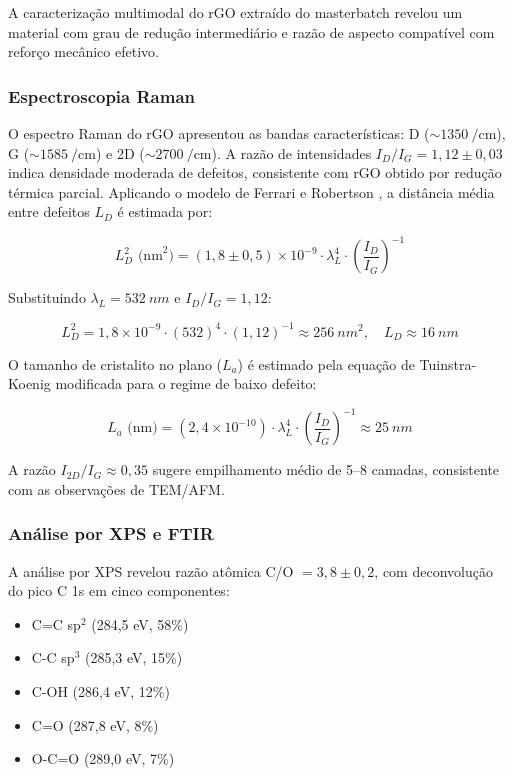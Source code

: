 \documentclass[12pt,a4paper,twoside]{article}
\begin{document}
A caracterização multimodal do rGO extraído do masterbatch revelou um material com grau de redução intermediário e razão de aspecto compatível com reforço mecânico efetivo.

\subsubsection{Espectroscopia Raman}

O espectro Raman do rGO apresentou as bandas características: D ($\sim\SI{1350}{\per\cm}$), G ($\sim\SI{1585}{\per\cm}$) e 2D ($\sim\SI{2700}{\per\cm}$). A razão de intensidades $I_D/I_G = 1,12 \pm 0,03$ indica densidade moderada de defeitos, consistente com rGO obtido por redução térmica parcial. Aplicando o modelo de Ferrari e Robertson \cite{Ferrari2000}, a distância média entre defeitos $L_D$ é estimada por:

\begin{equation}
L_D^2 \text{ (nm}^2\text{)} = (1,8 \pm 0,5) \times 10^{-9} \cdot \lambda_L^4 \cdot \left(\frac{I_D}{I_G}\right)^{-1}
\label{eq:ferrari}
\end{equation}

Substituindo $\lambda_L = \SI{532}{nm}$ e $I_D/I_G = 1,12$:

\begin{equation}
L_D^2 = 1,8 \times 10^{-9} \cdot (532)^4 \cdot (1,12)^{-1} \approx \SI{256}{nm^2}, \quad L_D \approx \SI{16}{nm}
\end{equation}

O tamanho de cristalito no plano ($L_a$) é estimado pela equação de Tuinstra-Koenig modificada para o regime de baixo defeito:

\begin{equation}
L_a \text{ (nm)} = (2,4 \times 10^{-10}) \cdot \lambda_L^4 \cdot \left(\frac{I_D}{I_G}\right)^{-1} \approx \SI{25}{nm}
\label{eq:tuinstra}
\end{equation}

A razão $I_{2D}/I_G \approx 0,35$ sugere empilhamento médio de 5--8 camadas, consistente com as observações de TEM/AFM.

\subsubsection{Análise por XPS e FTIR}

A análise por XPS revelou razão atômica C/O $= 3,8 \pm 0,2$, com deconvolução do pico C 1s em cinco componentes:
\begin{itemize}[nosep]
    \item C=C sp$^2$ (284,5 eV, 58\%)
    \item C-C sp$^3$ (285,3 eV, 15\%)
    \item C-OH (286,4 eV, 12\%)
    \item C=O (287,8 eV, 8\%)
    \item O-C=O (289,0 eV, 7\%)
\end{itemize}
\end{document}
